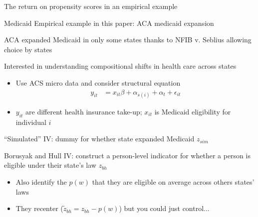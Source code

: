 \documentclass[notes,11pt, aspectratio=169]{beamer}
\newenvironment{wideitemize}{\itemize\addtolength{\itemsep}{10pt}}{\enditemize}
\begin{document}
\begin{frame}{The return on propensity scores in an empirical example}
  \begin{wideitemize}
  \item Medicaid Empirical example in this paper: ACA medicaid expansion
  \item ACA expanded Medicaid in only some states thanks to NFIB v. Seblius allowing choice by states
  \item Interested in understanding compositional shifts in health care across states
    \begin{itemize}
    \item Use ACS micro data and consider structural equation
      \begin{align*}
        y_{it} &= x_{it}\beta + \alpha_{s(i)} + \alpha_{t} + \epsilon_{it}
      \end{align*}
    \item $y_{it} $ are different health insurance take-up; $x_{it}$ is Medicaid eligibility for individual $i$
    \end{itemize}
  \item ``Simulated'' IV: dummy for whether state expanded Medicaid $z_{sim}$
  \item Borusyak and Hull IV: construct a person-level indicator for
    whether a person is eligible under their state's law $z_{bh}$
    \begin{itemize}
    \item Also identify the $p(w)$ that they are eligible on average across others states' laws
    \item They recenter ($\tilde{z}_{bh} = z_{bh} - p(w)$) but you could just control...
    \end{itemize}
  \end{wideitemize}
\end{frame}
\end{document}
